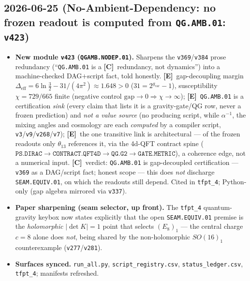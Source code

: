 \documentclass[11pt]{article}
\providecommand{\mE}{\textbf{[E]}}\providecommand{\mC}{\textbf{[C]}}
\providecommand{\vref}[1]{\texttt{#1}}
\providecommand{\gcar}{g_{\mathrm{car}}}\providecommand{\Nfam}{N_{\mathrm{fam}}}
\begin{document}
\subsection*{2026-06-25 (No-Ambient-Dependency: no frozen readout is computed from \texttt{QG.AMB.01}: \texttt{v423})}
\begin{itemize}
\item \textbf{New module \texttt{v423} (\texttt{QGAMB.NODEP.01}).} Sharpens the \vref{v369}/\vref{v384}
prose redundancy (``\texttt{QG.AMB.01} is a \mC\ redundancy, not dynamics'') into a machine-checked
DAG${+}$script fact, told honestly. \mE\ gap-decoupling margin
$\Delta_{\mathrm{eff}}=6\ln\tfrac32-31/(4\pi^2)\approx1.648>0$ ($31=2^{\gcar}-1$), susceptibility
$\chi=729/665$ finite (negative control $\mathrm{gap}\!\to\!0\Rightarrow\chi\!\to\!\infty$); \mE\
\texttt{QG.AMB.01} is a certification \emph{sink} (every claim that lists it is a gravity-gate/QG row, never a
frozen prediction) and \emph{not a value source} (no producing script, while $\alpha^{-1}$, the mixing angles
and cosmology are each \emph{computed} by a compiler script, \vref{v3}/\vref{v9}/\vref{v268}/\vref{v7}); \mE\
the one transitive link is architectural --- of the frozen readouts only $\theta_{13}$ references it, via the
4d-QFT contract spine ($\texttt{PS.DIRAC}{\to}\texttt{CONTRACT.QFT4D}{\to}\texttt{QG.G2}{\to}\texttt{GATE.METRIC}$),
a coherence edge, not a numerical input. \mC\ verdict: \texttt{QG.AMB.01} is gap-decoupled certification ---
\vref{v369} as a DAG/script fact; honest scope --- this does \emph{not} discharge \texttt{SEAM.EQUIV.01}, on
which the readouts still depend. Cited in \texttt{tfpt\_4}; Python-only (gap algebra mirrored via \vref{v337}).
\item \textbf{Paper sharpening (seam selector, up front).} The \texttt{tfpt\_4} quantum-gravity keybox now
states explicitly that the open \texttt{SEAM.EQUIV.01} premise is the \emph{holomorphic} $|\det K|{=}1$ point
that selects $(E_8)_1$ --- the central charge $c{=}8$ alone does \emph{not}, being shared by the
non-holomorphic $SO(16)_1$ counterexample (\vref{v277}/\vref{v281}).
\item \textbf{Surfaces synced.} \texttt{run\_all.py}, \texttt{script\_registry.csv},
\texttt{status\_ledger.csv}, \texttt{tfpt\_4}; manifests refreshed.
\end{itemize}
\end{document}
